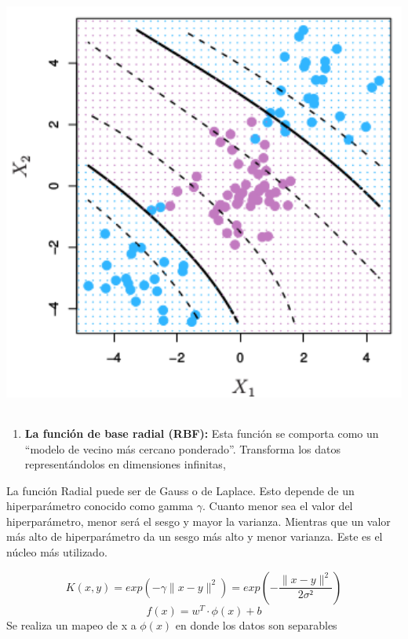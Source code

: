 \documentclass[
]{book}
\providecommand{\tightlist}{%
  \setlength{\itemsep}{0pt}\setlength{\parskip}{0pt}}
\begin{document}
\begin{center}\includegraphics[width=400pt,height=400pt]{img/02-svm/3-15-1-poli} \end{center}

\begin{enumerate}
\def\labelenumi{\arabic{enumi}.}
\setcounter{enumi}{2}
\tightlist
\item
  \textbf{La función de base radial (RBF):} Esta función se comporta como un ``modelo de vecino más cercano ponderado''. Transforma los datos representándolos en dimensiones infinitas,
\end{enumerate}

La función Radial puede ser de Gauss o de Laplace. Esto depende de un hiperparámetro conocido como gamma \(\gamma\). Cuanto menor sea el valor del hiperparámetro, menor será el sesgo y mayor la varianza. Mientras que un valor más alto de hiperparámetro da un sesgo más alto y menor varianza. Este es el núcleo más utilizado.

\[K(x, y)=exp(-\gamma \parallel x - y\parallel^2)=exp(-\frac{\parallel x-y \parallel ^2}{2\sigma²})\]
\[f(x)=w^T \cdot \phi(x) + b\]
Se realiza un mapeo de x a \(\phi(x)\) en donde los datos son separables
\end{document}
